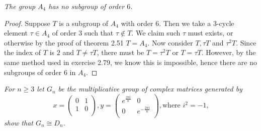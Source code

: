 \begin{problem}\em
The group $A_4$ has no subgroup of order $6$.
\end{problem}
\begin{proof}
Suppose $T$ is a subgroup of $A_4$ with order $6$. Then we take a $3$-cycle element $\tau\in A_4$ of order $3$ such that $\tau\notin T$. We claim such $\tau$ must exists, or otherwise by the proof of theorem 2.51 $T=A_4$. Now consider $T,\tau T$ and $\tau^2T$. Since the index of $T$ is $2$ and $T\ne\tau T$, there must be $T=\tau^2T$ or $T=\tau T$. However, by the same method used in exercise 2.79, we know this is impossible, hence there are no subgroups of order $6$ in $A_4$.
\end{proof}
\begin{problem}\em
For $n\ge 3$ let $G_n$ be the multiplicative group of complex matrices generated by 
$$
x=\left( \begin{matrix}
	0&		1\\
	1&		0\\
\end{matrix} \right) ,y=\left( \begin{matrix}
	e^{\frac{2\pi \mathrm{i}}{n}}&		0\\
	0&		e^{-\frac{2\pi \mathrm{i}}{n}}\\
\end{matrix} \right) , \text{where $i^2=-1$,}
$$
show that $G_n\cong D_n$.
\end{problem}

